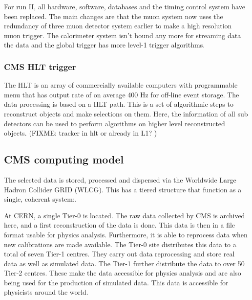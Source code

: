 For run II, all hardware, software, databases and the timing control system have been replaced. The main changes are that the muon system now uses the redundancy of three muon detector system earlier to make a high resolution muon trigger. The calorimeter system isn't bound any more for streaming data the data and the global trigger has more level-1 trigger algorithms. 

\subsubsection*{CMS HLT trigger}
The HLT is an array of commercially available computers with programmable menu that has output rate of on average 400 \si{ \hertz} for off-line event storage.
The data processing is based on a HLT path. This is a  set of algorithmic steps to reconstruct objects and make selections on them.  Here, the information of all sub detectors can be used to perform algorithms on higher level reconstructed objects. 
(FIXME: tracker in hlt or already in L1? )
\subsection{CMS computing model}
The selected data is stored, processed and dispersed via the Worldwide Large Hadron Collider GRID (WLCG)\cite{Grandi:814248,Eck:840543}. This has a tiered structure that function as a single, coherent system:. 

At CERN, a single Tier-0 is located. The raw data collected by CMS is archived here, and a first reconstruction of the data is done. This data is then in a file format usable for physics analysis. Furthermore, it is able to reprocess data when new calibrations are made available. The Tier-0 site distributes this data to a total of seven Tier-1 centres. They carry out data reprocessing and store real data as well as simulated  data. The Tier-1 further distribute the data to over 50 Tier-2 centres. These make the data accessible for physics analysis and are also being used for the production of simulated data. This data is accessible for  physicists around the world. 
